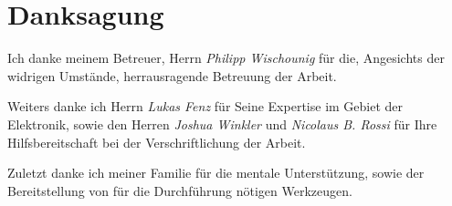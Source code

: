 \section*{Danksagung}

Ich danke meinem Betreuer, Herrn \textit{Philipp Wischounig} für die, Angesichts der widrigen Umstände, herrausragende Betreuung der Arbeit.

Weiters danke ich Herrn \textit{Lukas Fenz} für Seine Expertise im Gebiet der Elektronik, sowie den Herren \textit{Joshua Winkler} und \textit{Nicolaus B. Rossi} für Ihre Hilfsbereitschaft bei der Verschriftlichung der Arbeit.

Zuletzt danke ich meiner Familie für die mentale Unterstützung, sowie der Bereitstellung von für die Durchführung nötigen Werkzeugen.

\newpage